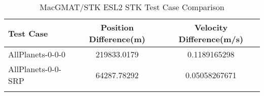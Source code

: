 \begin{table}[htbp!]
\centering
\caption{ MacGMAT/STK ESL2 STK Test Case Comparison}
      \begin{tabular}{lcc}
      \hline\hline
          Test Case & Position Difference(m) & Velocity Difference(m/s) \\
         \hline
         AllPlanets-0-0-0 & 219833.0179 & 0.1189165298 \\
         AllPlanets-0-0-SRP & 64287.78292 & 0.05058267671 \\
      \hline\hline
      \label{Table: ESL2 STK Table} 
\end{tabular}
\end{table}
